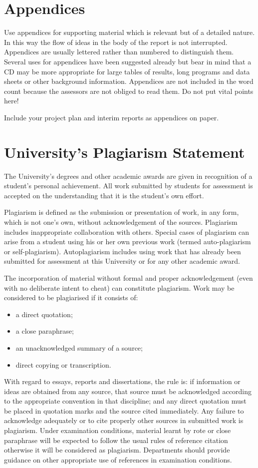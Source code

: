\section{Appendices}

Use appendices for supporting material which is relevant but of a detailed nature. In this way the flow of ideas in the body of the report is not interrupted. Appendices are usually lettered rather than numbered to distinguish them. Several uses for appendices have been suggested already but bear in mind that a CD may be more appropriate for large tables of results, long programs and data sheets or other background information. Appendices are not included in the word count because the assessors are not obliged to read them. Do not put vital points here!

Include your project plan and interim reports as appendices on paper.

\section{University's Plagiarism Statement}
\label{plagiarism sect}

The University's degrees and other academic awards are given in recognition of a student's personal achievement. All work submitted by students for assessment is accepted on the understanding that it is the student's own effort. 

Plagiarism is defined as the submission or presentation of work, in any form, which is not one's own, without acknowledgement of the sources. Plagiarism includes inappropriate collaboration with others. Special cases of plagiarism can arise from a student using his or her own previous work (termed auto-plagiarism or self-plagiarism). Autoplagiarism includes using work that has already been submitted for assessment at this University or for any other academic award.

The incorporation of material without formal and proper acknowledgement (even with no deliberate intent to cheat) can constitute plagiarism. Work may be considered to be plagiarised if it consists of: 
\begin{itemize}
\item
a direct quotation; 
\item
a close paraphrase; 
\item
an unacknowledged summary of a source; 
\item
direct copying or transcription.
\end{itemize}
With regard to essays, reports and dissertations, the rule is: if information or ideas are obtained from any source, that source must be acknowledged according to the appropriate convention in that discipline; and any direct quotation must be placed in quotation marks and the source cited immediately. Any failure to acknowledge adequately or to cite properly other sources in submitted work is plagiarism. Under examination conditions, material learnt by rote or close paraphrase will be expected to follow the usual rules of reference citation otherwise it will be considered as plagiarism. Departments should provide guidance on other appropriate use of references in examination conditions. 

